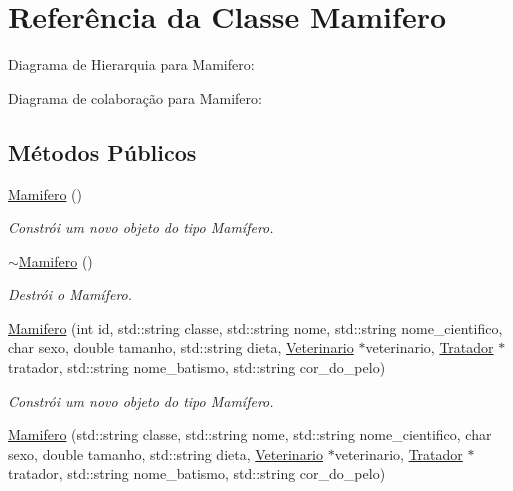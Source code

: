\hypertarget{classMamifero}{}\section{Referência da Classe Mamifero}
\label{classMamifero}


Diagrama de Hierarquia para Mamifero\+:


Diagrama de colaboração para Mamifero\+:
\subsection*{Métodos Públicos}
\begin{DoxyCompactItemize}
\item 
\mbox{\label{classMamifero_adc6af2531b40fb6b0bc91cb5bbb205e8}} 
\hyperlink{classMamifero_adc6af2531b40fb6b0bc91cb5bbb205e8}{Mamifero} ()
\begin{DoxyCompactList}\small\item\em Constrói um novo objeto do tipo Mamífero. \end{DoxyCompactList}\item 
\mbox{\label{classMamifero_a56eb196d45222e754eb6f19000667d5d}} 
\hyperlink{classMamifero_a56eb196d45222e754eb6f19000667d5d}{$\sim$\+Mamifero} ()
\begin{DoxyCompactList}\small\item\em Destrói o Mamífero. \end{DoxyCompactList}\item 
\hyperlink{classMamifero_a7f460155291cfc4ceea97bd74cc9e763}{Mamifero} (int id, std\+::string classe, std\+::string nome, std\+::string nome\+\_\+cientifico, char sexo, double tamanho, std\+::string dieta, \hyperlink{classVeterinario}{Veterinario} $\ast$veterinario, \hyperlink{classTratador}{Tratador} $\ast$tratador, std\+::string nome\+\_\+batismo, std\+::string cor\+\_\+do\+\_\+pelo)
\begin{DoxyCompactList}\small\item\em Constrói um novo objeto do tipo Mamífero. \end{DoxyCompactList}\item 
\hyperlink{classMamifero_aea0221cb04420d0d4565d9387b7f1b72}{Mamifero} (std\+::string classe, std\+::string nome, std\+::string nome\+\_\+cientifico, char sexo, double tamanho, std\+::string dieta, \hyperlink{classVeterinario}{Veterinario} $\ast$veterinario, \hyperlink{classTratador}{Tratador} $\ast$tratador, std\+::string nome\+\_\+batismo, std\+::string cor\+\_\+do\+\_\+pelo)

\end{DoxyCompactItemize}
